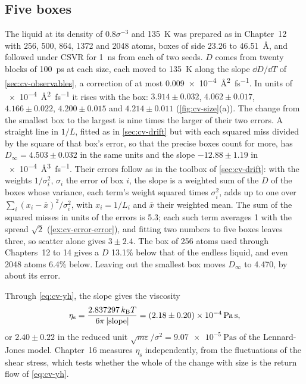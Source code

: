\subsection*{Five boxes}

The liquid at its density of $0.8\sigma^{-3}$ and \SI{135}{\kelvin} was
prepared as in Chapter~12 with 256, 500, 864, 1372 and 2048 atoms, boxes of
side 23.26 to \SI{46.51}{\angstrom}, and followed under CSVR for
\SI{1}{\nano\second} from each of two seeds. $D$ comes from twenty blocks
of \SI{100}{\pico\second} at each size, each moved to \SI{135}{\kelvin}
along the slope $\dd D/\dd T$ of \cref{sec:cv-observables}, a correction
of at most \SI{0.009e-4}{\angstrom\squared\per\femto\second}. In units of
\SI{e-4}{\angstrom\squared\per\femto\second} it rises with the box: $3.914
\pm 0.032$, $4.062 \pm 0.017$, $4.166 \pm 0.022$, $4.200 \pm 0.015$ and
$4.214 \pm 0.011$ (\cref{fig:cv-size}(a)). The change from the smallest box
to the largest is nine times the larger of their two errors. A straight
line in $1/L$, fitted as in \cref{sec:cv-drift} but with each squared miss
divided by the square of that box's error, so that the precise boxes count
for more, has $D_\infty = 4.503 \pm 0.032$ in the same units and the slope
$-12.88 \pm 1.19$ in \SI{e-4}{\angstrom\cubed\per\femto\second}. Their
errors follow as in the toolbox of \cref{sec:cv-drift}: with the weights
$1/\sigma_i^2$, $\sigma_i$ the error of box $i$, the slope is a weighted sum
of the $D$ of the boxes whose variance, each term's weight squared times
$\sigma_i^2$, adds up to one over $\sum_i(x_i - \bar x)^2/\sigma_i^2$, with
$x_i = 1/L_i$ and $\bar x$ their weighted mean. The sum
of the squared misses in units of the errors is 5.3; each such term
averages 1 with the spread $\sqrt2$ (\cref{ex:cv-error-error}), and
fitting two numbers to five boxes leaves three, so scatter alone gives $3
\pm 2.4$. The box of 256 atoms used through
Chapters~12 to 14 gives a $D$ 13.1\% below that of the endless liquid, and
even 2048 atoms 6.4\% below. Leaving out the smallest box moves
$D_\infty$ to 4.470, by about its error.

Through \cref{eq:cv-yh}, the slope gives the viscosity
\begin{equation*}
   \eta_{\mathrm s} = \frac{2.837297\,k_{\mathrm{B}} T}{6\pi\,\lvert\text{slope}\rvert}
   = (2.18 \pm 0.20)\times10^{-4}\,\si{\pascal\second} ,
\end{equation*}
or $2.40 \pm 0.22$ in the reduced unit $\sqrt{m\varepsilon}/\sigma^2 =
\SI{9.07e-5}{\pascal\second}$ of the Lennard-Jones model. Chapter~16 measures $\eta_{\mathrm s}$ independently,
from the fluctuations of the shear stress, which tests whether the whole
of the change with size is the return flow of \cref{eq:cv-yh}.

